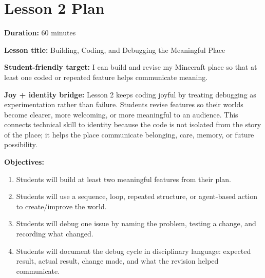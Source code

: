 \newpage
\section*{Lesson 2 Plan}

\textbf{Duration:} 60 minutes

\textbf{Lesson title:} Building, Coding, and Debugging the Meaningful Place

\textbf{Student-friendly target:} I can build and revise my Minecraft place so that at least one coded or repeated feature helps communicate meaning.

\textbf{Joy + identity bridge:} Lesson 2 keeps coding joyful by treating debugging as experimentation rather than failure. Students revise features so their worlds become clearer, more welcoming, or more meaningful to an audience. This connects technical skill to identity because the code is not isolated from the story of the place; it helps the place communicate belonging, care, memory, or future possibility.

\textbf{Objectives:}
\begin{enumerate}[leftmargin=*]
    \item Students will build at least two meaningful features from their plan.
    \item Students will use a sequence, loop, repeated structure, or agent-based action to create/improve the world.
    \item Students will debug one issue by naming the problem, testing a change, and recording what changed.
    \item \textcolor{LessonTwoAccent}{Students will document the debug cycle in disciplinary language: expected result, actual result, change made, and what the revision helped communicate.}
\end{enumerate}

